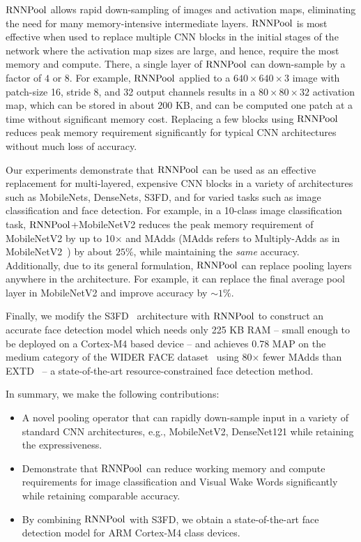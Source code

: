 \documentclass[10pt]{article}
\newcommand{\rpool}{\ensuremath{{\rm RNNPool}}\xspace}
\newcommand{\rpooln}{\ensuremath{{\rm RNNPool}}}
\begin{document}
\rpool allows rapid down-sampling of images and activation maps,
eliminating the need for many memory-intensive intermediate
layers. \rpool is most effective when used to replace multiple CNN
blocks in the initial stages of the network where the activation map
sizes are large, and hence, require the most memory and compute.
There, a single layer of \rpool can down-sample by a factor of $4$ or
$8$. For example, \rpool applied to a $640\times640\times3$ image
with patch-size 16, stride 8, and 32 output channels results in a
$80\times80\times32$ activation map, which can be stored in about
$200$ KB, and can be computed one patch at a time without significant
memory cost.  Replacing a few blocks using \rpool reduces peak memory
requirement significantly for typical CNN architectures without much
loss of accuracy.

Our experiments demonstrate that \rpool can be used as an effective
replacement for multi-layered, expensive CNN blocks in a variety of
architectures such as MobileNets, DenseNets, S3FD, and for varied
tasks such as image classification and face detection.  For example,
in a 10-class image classification task, \rpooln+MobileNetV2 reduces
the peak memory requirement of MobileNetV2 by up to 10$\times$ and
MAdds (MAdds refers to Multiply-Adds as in
MobileNetV2~\cite{sandler2018mobilenetv2}) by about $25\%$, while
  maintaining the {\em same} accuracy. Additionally, due to its
  general formulation, \rpool can replace pooling layers anywhere in
  the architecture. For example, it can replace the final average pool
  layer in MobileNetV2 and improve accuracy by $\sim1\%$.

Finally, we modify the S3FD~\citep{zhang2017s3fd} architecture with
\rpool to construct an accurate face detection model which needs only
225 KB RAM -- small enough to be deployed on a Cortex-M4 based device
-- and achieves 0.78 MAP on the medium category of the WIDER FACE
dataset~\citep{yang2016wider} using 80$\times$ fewer MAdds than
EXTD~\citep{yoo2019extd} -- a state-of-the-art resource-constrained
face detection method.

In summary, we make the following contributions:
\begin{itemize}[leftmargin=*]\vspace{-1mm}
    \itemsep 0pt
    \topsep 0pt
    \parskip 2pt
\item A novel pooling operator that can rapidly down-sample input in a
  variety of standard CNN architectures, e.g., MobileNetV2,
  DenseNet121 while retaining the expressiveness.
\item Demonstrate that \rpool can reduce working memory and compute
  requirements for image classification and Visual Wake Words
  significantly while retaining comparable accuracy.
\item By combining \rpool with S3FD, we obtain a state-of-the-art face
  detection model for ARM Cortex-M4 class devices.
\end{itemize}
\end{document}
